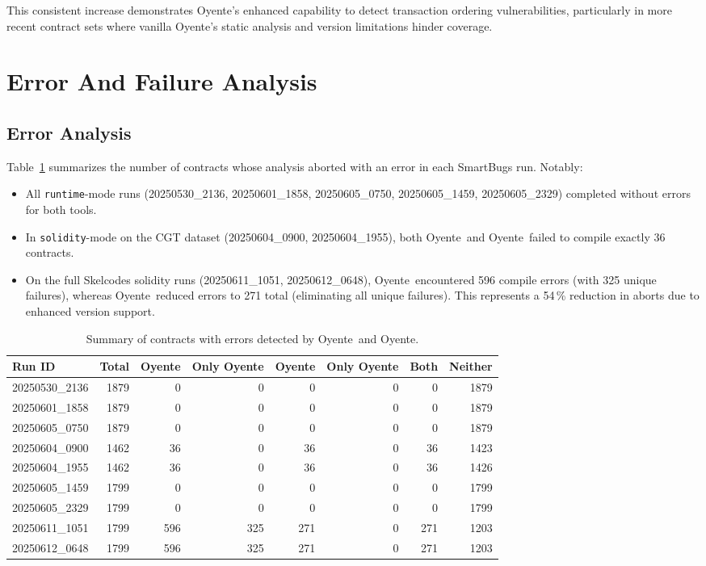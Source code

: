 \documentclass{article}
\newcommand\OY{Oyente}
\newcommand\OYp{\OY\raisebox{0.3ex}{\smaller +}}
\newcommand\CGTrbcA{20250530\_2136}%
\newcommand\CGTrbcB{20250601\_1858}%
\newcommand\CGTrbcC{20250605\_0750}%
\newcommand\CGTsscA{20250604\_0900}%
\newcommand\CGTsscB{20250604\_1955}%
\newcommand\SKCrbcA{20250605\_1459}%
\newcommand\SKCrbcB{20250605\_2329}%
\newcommand\SKCsscA{20250611\_1051}%
\newcommand\SKCsscB{20250612\_0648}%
\begin{document}
	This consistent increase demonstrates \OYp’s enhanced capability to detect transaction ordering vulnerabilities, particularly in more recent contract sets where vanilla \OY’s static analysis and version limitations hinder coverage.

	\section{Error And Failure Analysis}

	\subsection{Error Analysis}
	Table~\ref{tab:summary_errors} summarizes the number of contracts whose analysis aborted with an error in each SmartBugs run. Notably:

	\begin{itemize}
		\item All \texttt{runtime}-mode runs (\CGTrbcA, \CGTrbcB, \CGTrbcC, \SKCrbcA, \SKCrbcB) completed without errors for both tools.
		\item In \texttt{solidity}-mode on the CGT dataset (\CGTsscA, \CGTsscB), both \OY\ and \OYp\ failed to compile exactly 36 contracts.
		\item On the full Skelcodes solidity runs (\SKCsscA, \SKCsscB), \OY\ encountered 596 compile errors (with 325 unique failures), whereas \OYp\ reduced errors to 271 total (eliminating all unique failures). This represents a 54\,\% reduction in aborts due to enhanced version support.
	\end{itemize}

	\begin{table}[ht]
		\centering
		\begin{tabular}{lrrrrrrr}
			\toprule
			\textbf{Run ID} & \textbf{Total} & \textbf{\OY} & \textbf{Only \OY} & \textbf{\OYp} & \textbf{Only \OYp} & \textbf{Both} & \textbf{Neither} \\
			\midrule
			\CGTrbcA & 1879 & 0 & 0 & 0 & 0 & 0 & 1879 \\
			\CGTrbcB & 1879 & 0 & 0 & 0 & 0 & 0 & 1879 \\
			\CGTrbcC & 1879 & 0 & 0 & 0 & 0 & 0 & 1879 \\
			\CGTsscA & 1462 & 36 & 0 & 36 & 0 & 36 & 1423 \\
			\CGTsscB & 1462 & 36 & 0 & 36 & 0 & 36 & 1426 \\
			\SKCrbcA & 1799 & 0 & 0 & 0 & 0 & 0 & 1799 \\
			\SKCrbcB & 1799 & 0 & 0 & 0 & 0 & 0 & 1799 \\
			\SKCsscA & 1799 & 596 & 325 & 271 & 0 & 271 & 1203 \\
			\SKCsscB & 1799 & 596 & 325 & 271 & 0 & 271 & 1203 \\
			\bottomrule
		\end{tabular}
		\caption{Summary of contracts with errors detected by \OY\ and \OYp.}
		\label{tab:summary_errors}
	\end{table}
\end{document}
